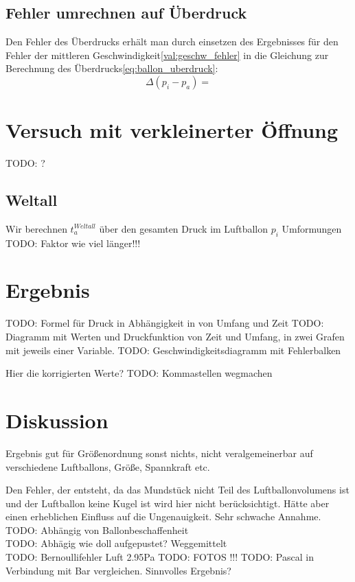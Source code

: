 \documentclass{article}
\begin{document}
        \subsection{Fehler umrechnen auf Überdruck}
            Den Fehler des Überdrucks erhält man durch einsetzen des Ergebnisses für den Fehler der mittleren Geschwindigkeit\ref{val:geschw_fehler}
            in die Gleichung zur Berechnung des Überdrucks\ref{eq:ballon_uberdruck}:
            \begin{equation}
                \Delta (p_i - p_a) = 
            \end{equation}
    
    \section{Versuch mit verkleinerter Öffnung}
        TODO: ?
        
    \subsection{Weltall}
        Wir berechnen \(t_a^{Weltall}\) über den gesamten Druck im Luftballon \( p_i \)
        Umformungen
        TODO: Faktor wie viel länger!!!
    
    
    \section{Ergebnis}
        TODO: Formel für Druck in Abhängigkeit in von Umfang und Zeit
        TODO: Diagramm mit Werten und Druckfunktion von Zeit und Umfang, in zwei Grafen mit jeweils einer Variable.
        TODO: Geschwindigkeitsdiagramm mit Fehlerbalken

        Hier die korrigierten Werte?
        TODO: Kommastellen wegmachen \\

    \section{Diskussion}
        Ergebnis gut für Größenordnung sonst nichts, nicht veralgemeinerbar auf verschiedene Luftballons, Größe, Spannkraft etc.

        Den Fehler, der entsteht, da das Mundstück nicht Teil des Luftballonvolumens ist und der Luftballon keine Kugel ist wird hier nicht berücksichtigt.
        Hätte aber einen erheblichen Einfluss auf die Ungenauigkeit. Sehr schwache Annahme.
        TODO: Abhängig von Ballonbeschaffenheit \\
        TODO: Abhägig wie doll aufgepustet? Weggemittelt \\
        TODO: Bernoullifehler Luft 2.95Pa
        TODO: FOTOS !!!
        TODO: Pascal in Verbindung mit Bar vergleichen. Sinnvolles Ergebnis?
\end{document}
